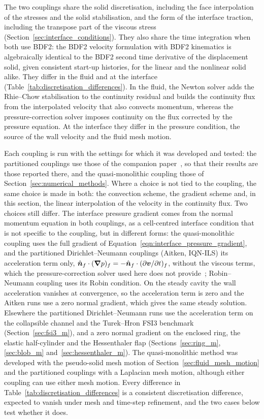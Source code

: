 The two couplings share the solid discretisation, including the face interpolation of the stresses and the solid stabilisation, and the form of the interface traction, including the transpose part of the viscous stress (Section~\ref{sec:interface_conditions}).
They also share the time integration when both use BDF2: the BDF2 velocity formulation with BDF2 kinematics is algebraically identical to the BDF2 second time derivative of the displacement solid, given consistent start-up histories, for the linear and the nonlinear solid alike.
They differ in the fluid and at the interface (Table~\ref{tab:discretisation_differences}).
In the fluid, the Newton solver adds the Rhie--Chow stabilisation to the continuity residual and builds the continuity flux from the interpolated velocity that also convects momentum, whereas the pressure-correction solver imposes continuity on the flux corrected by the pressure equation.
At the interface they differ in the pressure condition, the source of the wall velocity and the fluid mesh motion.

Each coupling is run with the settings for which it was developed and tested: the partitioned couplings use those of the companion paper~\citep{CardiffFSIVerification2026}, so that their results are those reported there, and the quasi-monolithic coupling those of Section~\ref{sec:numerical_methods}.
Where a choice is not tied to the coupling, the same choice is made in both: the convection scheme, the gradient scheme and, in this section, the linear interpolation of the velocity in the continuity flux.
Two choices still differ.
The interface pressure gradient comes from the normal momentum equation in both couplings, as a cell-centred interface condition that is not specific to the coupling, but in different forms: the quasi-monolithic coupling uses the full gradient of Equation~\eqref{eqn:interface_pressure_gradient}, and the partitioned Dirichlet--Neumann couplings (Aitken, IQN-ILS) its acceleration term only, $\hat{\boldsymbol{n}}_f\cdot(\boldsymbol{\nabla}p)_f = -\hat{\boldsymbol{n}}_f\cdot(\partial\boldsymbol{v}/\partial t)_f$, without the viscous terms, which the pressure-correction solver used here does not provide~\citep{solids4foamIssue721}; Robin--Neumann coupling uses its Robin condition.
On the steady cavity the wall acceleration vanishes at convergence, so the acceleration term is zero and the Aitken runs use a zero normal gradient, which gives the same steady solution.
Elsewhere the partitioned Dirichlet--Neumann runs use the acceleration term on the collapsible channel and the Turek--Hron FSI3 benchmark (Section~\ref{sec:fsi3_m}), and a zero normal gradient on the enclosed ring, the elastic half-cylinder and the Hessenthaler flap (Sections~\ref{sec:ring_m}, \ref{sec:blob_m} and~\ref{sec:hessenthaler_m}).
The quasi-monolithic method was developed with the pseudo-solid mesh motion of Section~\ref{sec:fluid_mesh_motion} and the partitioned couplings with a Laplacian mesh motion, although either coupling can use either mesh motion.
Every difference in Table~\ref{tab:discretisation_differences} is a consistent discretisation difference, expected to vanish under mesh and time-step refinement, and the two cases below test whether it does.

